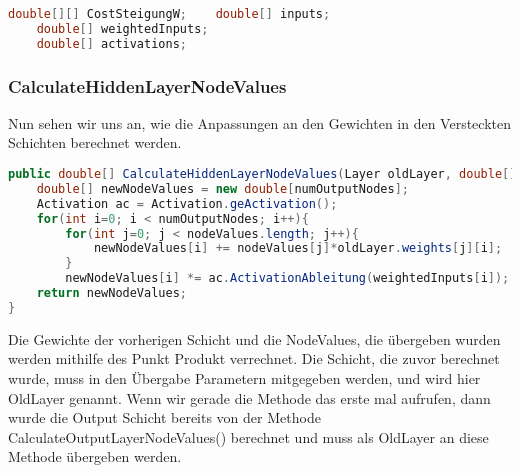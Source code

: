 \documentclass[12pt]{article}
\begin{document}
\begin{lstlisting}[language=Java]
    double[][] CostSteigungW;    double[] inputs;
    double[] weightedInputs;
    double[] activations;
\end{lstlisting}\subsubsection{ CalculateHiddenLayerNodeValues}Nun sehen wir uns an, wie die Anpassungen an den Gewichten in den Versteckten Schichten berechnet werden.\begin{lstlisting}[language=Java]
public double[] CalculateHiddenLayerNodeValues(Layer oldLayer, double[] nodeValues) {
    double[] newNodeValues = new double[numOutputNodes];
    Activation ac = Activation.geActivation();
    for(int i=0; i < numOutputNodes; i++){
        for(int j=0; j < nodeValues.length; j++){
            newNodeValues[i] += nodeValues[j]*oldLayer.weights[j][i];
        } 
        newNodeValues[i] *= ac.ActivationAbleitung(weightedInputs[i]);
    return newNodeValues;
}
\end{lstlisting}
Die Gewichte der vorherigen Schicht und die NodeValues, die übergeben wurden werden mithilfe des Punkt Produkt verrechnet. Die Schicht, die zuvor berechnet wurde, muss in den Übergabe Parametern mitgegeben werden, und wird hier OldLayer genannt. Wenn wir gerade die Methode das erste mal aufrufen, dann wurde die Output Schicht bereits von der Methode CalculateOutputLayerNodeValues() berechnet und muss als OldLayer an diese Methode übergeben werden.
\end{document}

